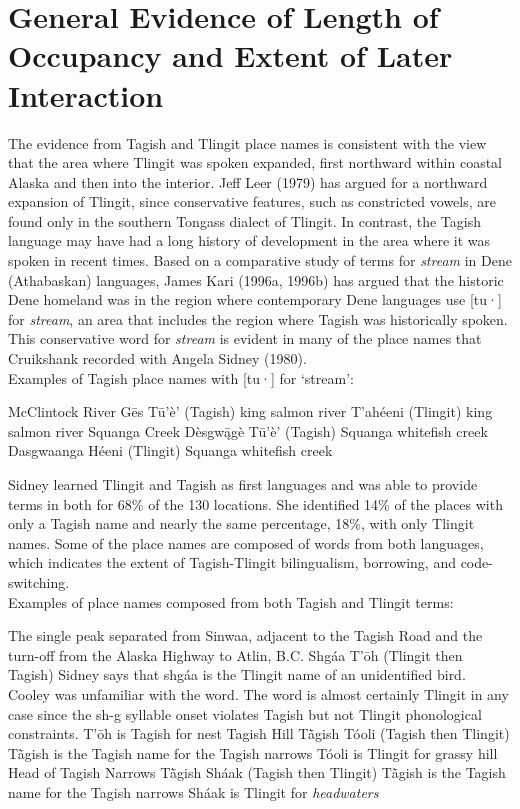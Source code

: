 \section{General Evidence of Length of Occupancy and Extent of Later Interaction}

The evidence from Tagish and Tlingit place names is consistent with the view that the area where Tlingit was spoken expanded, first northward within coastal Alaska and then into the interior.  Jeff Leer (1979) has argued for a northward expansion of Tlingit, since conservative features, such as constricted vowels, are found only in the southern Tongass dialect of Tlingit. In contrast, the Tagish language may have had a long history of development in the area where it was spoken in recent times. Based on a comparative study of terms for \textit{stream} in Dene (Athabaskan) languages, James Kari (1996a, 1996b) has argued that the historic Dene homeland was in the region where contemporary Dene languages use [tu·] for \textit{stream}, an area that includes the region where Tagish was historically spoken. This conservative word for \textit{stream} is evident in many of the place names that Cruikshank recorded with Angela Sidney (1980).\\

 Examples of Tagish place names with [tu·] for ‘stream’:
\begin{exe}

	McClintock River
\sn Gēs Tū’è’ (Tagish)		king salmon river
\sn T’ahéeni (Tlingit) 		king salmon river
 	Squanga Creek
\sn 	Dèsgwą̄gè Tū’è’ (Tagish)	Squanga whitefish creek
\sn 	Dasgwaanga Héeni (Tlingit)	Squanga whitefish creek
\end{exe}

Sidney learned Tlingit and Tagish as first languages and was able to provide terms in both for 68\% of the 130 locations. She identified 14\% of the places with only a Tagish name and nearly the same percentage, 18\%, with only Tlingit names. Some of the place names are composed of words from both languages, which indicates the extent of Tagish-Tlingit bilingualism, borrowing, and code-switching.\\

Examples of place names composed from both Tagish and Tlingit terms:
\begin{exe}
	The single peak separated from Sinwaa, adjacent to the Tagish Road and the
turn-off from the Alaska Highway to Atlin, B.C.
	\sn Shgáa	T’ōh	 (Tlingit then Tagish)	Sidney says that shgáa is the Tlingit name of an
unidentified bird. Cooley was unfamiliar with the word.
The word is almost certainly Tlingit in any case since the sh-g syllable onset violates Tagish but not Tlingit phonological constraints.
T’ōh is Tagish for nest
 	Tagish Hill
\sn Tā̀gish Tóoli	 (Tagish then Tlingit) Tā̀gish is the Tagish name for the Tagish narrows
	\sn		Tóoli is Tlingit for grassy hill
 Head of Tagish Narrows
\sn Tā̀gish Sháak	 (Tagish then Tlingit) Tā̀gish is the Tagish name for the Tagish narrows
\sn				Sháak is Tlingit for \textit{headwaters}
\end{exe}


